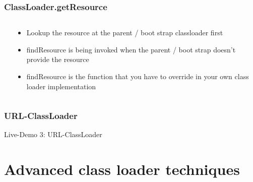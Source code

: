 \documentclass[aspectratio=169]{beamer}
\begin{document}
\begin{frame}[fragile]
	\frametitle{ClassLoader.getResource}
	\begin{columns}[T] 
		\begin{column}{.50\textwidth}
			
	\end{column}
	\hfill
	\begin{column}{.50\textwidth}
			\begin{itemize}
				\item{Lookup the resource at the parent / boot strap classloader first}
				\item{findResource is being invoked when the parent / boot strap doesn't provide the resource}
				\item{findResource is the function that you have to override in your own class loader implementation}
			\end{itemize}
		\end{column}
	\end{columns}
\end{frame}

\begin{frame}
	\frametitle{URL-ClassLoader}
	
\end{frame}

\begin{frame}
	Live-Demo 3: URL-ClassLoader
\end{frame}
 
\section{Advanced class loader techniques}
\end{document}
